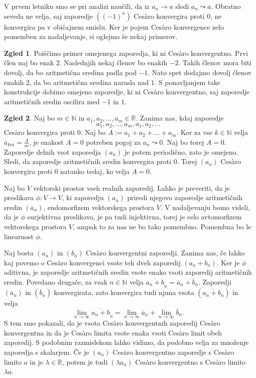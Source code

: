 \documentclass[a4paper,12pt]{article}
\def\N{\mathbb{N}}
\def\R{\mathbb{R}}
\theoremstyle{definition}
\newtheorem{zgled}{Zgled}
\theoremstyle{plain}
\begin{document}
V prvem letniku smo se pri analizi naučili, da iz $a_n \rightarrow a$ sledi $a_n \leadsto a$. Obratno seveda ne velja, saj zaporedje $((-1)^n)$ Ces\`{a}ro konvergira proti $0$, ne konvergira pa v običajnem smislu. Ker je pojem Ces\`{a}ro konvergence zelo pomemben za nadaljevanje, si oglejmo še nekaj primerov.

\begin{zgled}
    Poiščimo primer omejenega zaporedja, ki ni Ces\`{a}ro konvergentno. Prvi člen naj bo enak $2$. Naslednjih nekaj členov bo enakih $-2$. Takih členov mora biti dovolj, da bo aritmetična sredina padla pod $-1$. Nato spet dodajmo dovolj členov enakih $2$, da bo aritmetična sredina narasla nad $1$. S ponavljanjem take konstrukcije dobimo omejeno zaporedje, ki ni Ces\`{a}ro konvergentno, saj zaporedje aritmetičnih sredin oscilira med $-1$ in $1$.
\end{zgled}

\begin{zgled}
    Naj bo $m \in \mathbb{N}$ in $a_1, a_2, \ldots, a_m \in \mathbb{R}$. Zanima nas, kdaj zaporedje 
    $$a_1, a_2, \ldots, a_m, a_1, a_2, \ldots$$ 
    Ces\`{a}ro konvergira proti $0$. Naj bo $A := a_1 + a_2 + \ldots + a_m$. Ker za vse $k \in \mathbb{N}$ velja $\overline{a}_{km} = \frac{A}{m}$, je enakost $A = 0$ potreben pogoj za $a_n \leadsto 0$. Naj bo torej $A = 0$. Zaporedje delnih vsot zaporedja $(a_n)$ je potem periodično, zato je omejeno. Sledi, da zaporedje aritmetičnih sredin konvergira proti $0$. Torej $(a_n)$ Ces\`{a}ro konvergira proti $0$ natanko tedaj, ko velja $A = 0$.
\end{zgled}

Naj bo $V$ vektorski prostor vseh realnih zaporedij. Lahko je preveriti, da je preslikava $\phi: V \rightarrow V$, ki zaporedju $(a_n)$ priredi njegovo zaporedje aritmetičnih sredin $(\overline{a}_n)$, endomorfizem vektorskega prostora $V$. V nadaljevanju bomo videli, da je $\phi$ surjektivna preslikava, je pa tudi injektivna, torej je celo avtomorfizem vektorskega prostora $V$, ampak to za nas ne bo tako pomembno. Pomembna bo le linearnost $\phi$. 

Naj bosta $(a_n)$ in $(b_n)$ Ces\`{a}ro konvergentni zaporedji. Zanima nas, če lahko kaj povemo o Ces\`{a}ro konvergenci vsote teh dveh zaporedij $(a_n + b_n)$. Ker je $\phi$ aditivna, je zaporedje aritmetičnih sredin vsote enako vsoti zaporedij aritmetičnih sredin. Povedano drugače, za vsak $n \in \N$ velja $\overline{a_n + b}_n = \overline{a}_n + \overline{b}_n$. Zaporedji $(\overline{a}_n)$ in $(\overline{b}_n)$ konvergirata, zato konvergira tudi njuna vsota $(\overline{a_n + b_n})$ in velja
$$\lim_{n \rightarrow \infty} \overline{a_n + b}_n = \lim_{n \rightarrow \infty} \overline{a}_n + \lim_{n \rightarrow \infty} \overline{b}_n.$$
S tem smo pokazali, da je vsota Ces\`{a}ro konvergentnih zaporedij Ces\`{a}ro konvergentna in da je Ces\`{a}ro limita vsote enaka vsoti Ces\`{a}ro limit obeh zaporedij.
S podobnim razmislekom lahko vidimo, da podobno velja za množenje zaporedja s skalarjem. Če je $(a_n)$ Ces\`{a}ro konvergentno zaporedje s Ces\`{a}ro limito $a$ in je $\lambda \in \R$, potem je tudi $(\lambda a_n)$ Ces\`{a}ro konvergentno s Ces\`{a}ro limito $\lambda a$.
\end{document}
